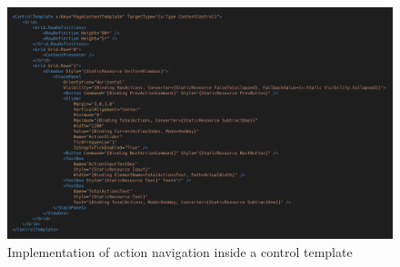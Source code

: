 \begin{figure}
\centering
\includegraphics[width=\textwidth]{figures/code/mvvm-arch/action-navigation-template.png}
\caption[Action navigation]{Implementation of action navigation inside a control template}
\label{fig:mvvm.actionnavigation}
\end{figure}

